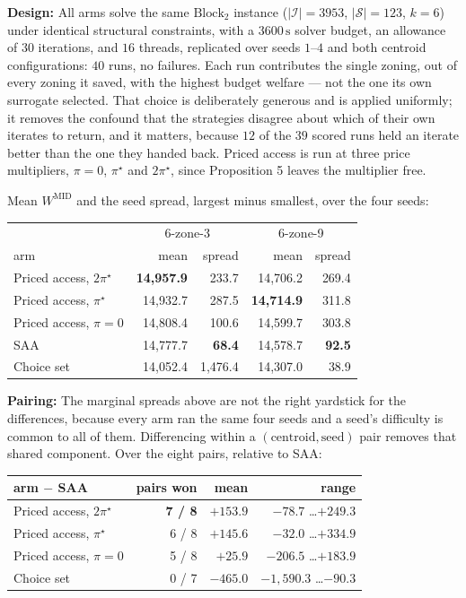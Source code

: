 \documentclass{article}
\begin{document}
\noindent\textbf{Design:}
All arms solve the same $\text{Block}_2$ instance ($|\mathcal{I}| = 3953$, $|\mathcal{S}| = 123$, $k = 6$) under identical structural constraints, with a $3600\,\mathrm{s}$ solver budget, an allowance of $30$ iterations, and $16$ threads, replicated over seeds $1$--$4$ and both centroid configurations: $40$ runs, no failures. Each run contributes the single zoning, out of every zoning it saved, with the highest budget welfare --- not the one its own surrogate selected. That choice is deliberately generous and is applied uniformly; it removes the confound that the strategies disagree about which of their own iterates to return, and it matters, because $12$ of the $39$ scored runs held an iterate better than the one they handed back. Priced access is run at three price multipliers, $\pi = 0$, $\pi^\star$ and $2\pi^\star$, since Proposition 5 leaves the multiplier free.

Mean $W^{\mathrm{MID}}$ and the seed spread, largest minus smallest, over the four seeds:

\begin{center}
\begin{tabular}{lrrrr}
\hline
& \multicolumn{2}{c}{6-zone-3} & \multicolumn{2}{c}{6-zone-9} \\
arm & mean & spread & mean & spread \\
\hline
Priced access, $2\pi^\star$ & \textbf{14{,}957.9} & 233.7 & 14{,}706.2 & 269.4 \\
Priced access, $\pi^\star$  & 14{,}932.7 & 287.5 & \textbf{14{,}714.9} & 311.8 \\
Priced access, $\pi = 0$    & 14{,}808.4 & 100.6 & 14{,}599.7 & 303.8 \\
SAA                         & 14{,}777.7 & \textbf{68.4} & 14{,}578.7 & \textbf{92.5} \\
Choice set                  & 14{,}052.4 & 1{,}476.4 & 14{,}307.0 & 38.9 \\
\hline
\end{tabular}
\end{center}

\noindent\textbf{Pairing:}
The marginal spreads above are not the right yardstick for the differences, because every arm ran the same four seeds and a seed's difficulty is common to all of them. Differencing within a $(\text{centroid}, \text{seed})$ pair removes that shared component. Over the eight pairs, relative to SAA:

\begin{center}
\begin{tabular}{lrrr}
\hline
arm $-$ SAA & pairs won & mean & range \\
\hline
Priced access, $2\pi^\star$ & \textbf{7 / 8} & \textbf{$+153.9$} & $-78.7$ \ldots $+249.3$ \\
Priced access, $\pi^\star$  & 6 / 8 & $+145.6$ & $-32.0$ \ldots $+334.9$ \\
Priced access, $\pi = 0$    & 5 / 8 & $+25.9$  & $-206.5$ \ldots $+183.9$ \\
Choice set                  & 0 / 7 & $-465.0$ & $-1{,}590.3$ \ldots $-90.3$ \\
\hline
\end{tabular}
\end{center}
\end{document}
